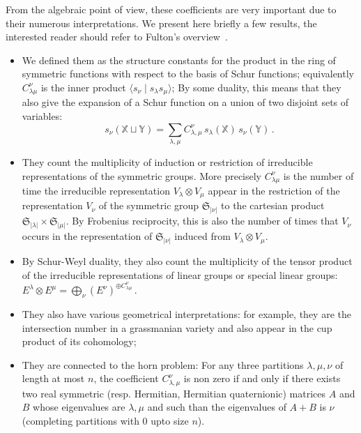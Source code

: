 \documentclass[12pt,a4paper]{article}
\newcommand{\SG}{{\mathfrak S}}
\newcommand{\alphX}{{\mathbb X}}
\newcommand{\alphY}{{\mathbb Y}}
\begin{document}
From the algebraic point of view, these coefficients are very important due to
their numerous interpretations. We present here briefly a few results, the
interested reader should refer to Fulton's overview~\cite{Fulton}.
\begin{itemize}
\item We defined them as the structure constants for the product in the ring
  of symmetric functions with respect to the basis of Schur functions;
  equivalently $C_{\lambda\mu}^\nu$ is the inner product $\langle s_\nu \mid
  s_\lambda s_\mu\rangle$; By some duality, this means that they also give the
  expansion of a Schur function on a union of two disjoint sets of variables:
  \begin{equation}
    s_\nu(\alphX\sqcup\alphY) = 
    \sum_{\lambda,\mu} C_{\lambda,\mu}^{\nu}\,
    s_\lambda(\alphX)\, s_\nu(\alphY)\,.
  \end{equation}
\item They count the multiplicity of induction or restriction of irreducible
  representations of the symmetric groups. More precisely $C_{\lambda\mu}^\nu$
  is the number of time the irreducible representation $V_\lambda \otimes
  V_\mu$ appear in the restriction of the representation $V_\nu$ of the
  symmetric group $\SG_{|\nu|}$ to the cartesian product $\SG_{|\lambda|}
  \times \SG_{|\mu|}$. By Frobenius reciprocity, this is also the number of
  times that $V_\nu$ occurs in the representation of $\SG_{|\nu|}$ induced
  from $V_\lambda \otimes V_\mu$.
\item By Schur-Weyl duality, they also count the multiplicity of the tensor
  product of the irreducible representations of linear groups or special
  linear groups:
    $E^\lambda \otimes E^\mu =\bigoplus_\nu (E^\nu)^{\oplus C_{\lambda\mu}^\nu}\,.$
  \item They also have various geometrical interpretations: for example, they
    are the intersection number in a grassmanian variety and also appear in
    the cup product of its cohomology;
  \item They are connected to the horn problem: For any three partitions
    $\lambda,\mu,\nu$ of length at most $n$, the coefficient
    $C_{\lambda,\mu}^{\nu}$ is non zero if and only if there exists two real
    symmetric (resp. Hermitian, Hermitian quaternionic) matrices $A$ and $B$
    whose eigenvalues are $\lambda,\mu$ and such than the eigenvalues of $A+B$
    is $\nu$ (completing partitions with $0$ upto size $n$).

\end{itemize}
\end{document}
